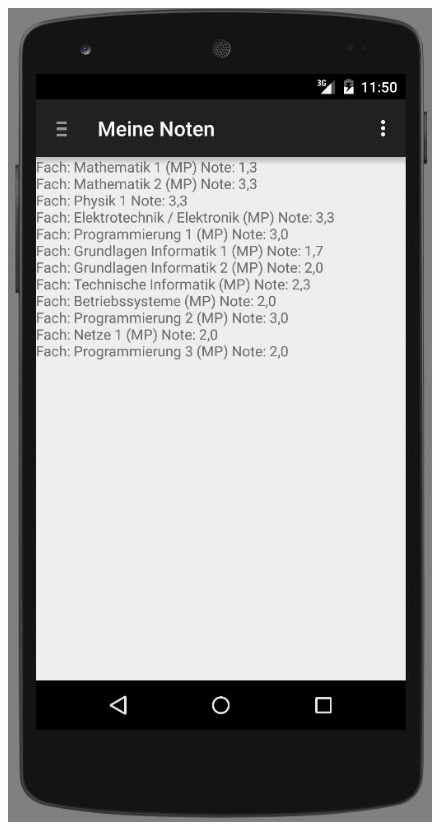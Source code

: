 \begin{figure}[h]
	\centering
	\includegraphics[scale=0.6]{03_Bedienungsanleitung/img/noten.jpg}
	\label{img:grafik-dummy}
\end{figure}

\newpage

